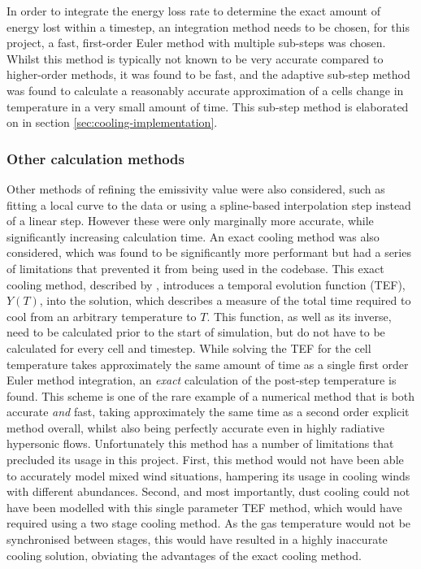 In order to integrate the energy loss rate to determine the exact amount of energy lost within a timestep, an integration method needs to be chosen, for this project, a fast, first-order Euler method with multiple sub-steps was chosen.
Whilst this method is typically not known to be very accurate compared to higher-order methods, it was found to be fast, and the adaptive sub-step method was found to calculate a reasonably accurate approximation of a cells change in temperature in a very small amount of time.
This sub-step method is elaborated on in section \ref{sec:cooling-implementation}.

\subsubsection{Other calculation methods}
\label{sec:othercalc}

Other methods of refining the emissivity value were also considered, such as fitting a local curve to the data or using a spline-based interpolation step instead of a linear step.
However these were only marginally more accurate, while significantly increasing calculation time.
An exact cooling method was also considered, which was found to be significantly more performant but had a series of limitations that prevented it from being used in the codebase.
This exact cooling method, described by \textcite{townsendExactIntegrationScheme2009}, introduces a temporal evolution function (TEF), $Y(T)$, into the solution, which describes a measure of the total time required to cool from an arbitrary temperature to $T$.
This function, as well as its inverse, need to be calculated prior to the start of simulation, but do not have to be calculated for every cell and timestep.
While solving the TEF for the cell temperature takes approximately the same amount of time as a single first order Euler method integration, an \emph{exact} calculation of the post-step temperature is found.
This scheme is one of the rare example of a numerical method that is both accurate \emph{and} fast, taking approximately the same time as a second order explicit method overall, whilst also being perfectly accurate even in highly radiative hypersonic flows.
Unfortunately this method has a number of limitations that precluded its usage in this project.
First, this method would not have been able to accurately model mixed wind situations, hampering its usage in cooling winds with different abundances.
Second, and most importantly, dust cooling could not have been modelled with this single parameter TEF method, which would have required using a two stage cooling method.
As the gas temperature would not be synchronised between stages, this would have resulted in a highly inaccurate cooling solution, obviating the advantages of the exact cooling method.

